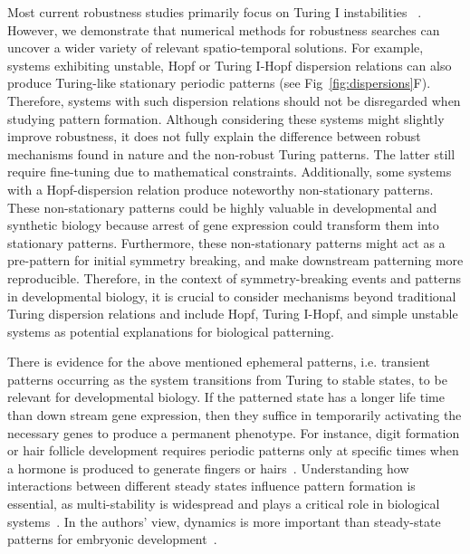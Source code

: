 \documentclass[10pt,letterpaper]{article}
\begin{document}
Most current robustness studies primarily focus on Turing I instabilities ~\parencite{Scholes2019, Zheng2016, Marcon}.
However, we demonstrate that numerical methods for robustness searches can uncover a wider variety of relevant spatio-temporal solutions.
For example, systems exhibiting unstable, Hopf or Turing I-Hopf dispersion relations can also produce Turing-like stationary periodic patterns (see Fig~\ref{fig:dispersions}F). Therefore, systems with such dispersion relations should not be disregarded when studying pattern formation.
Although considering these systems might slightly improve robustness, it does not fully explain the difference between robust mechanisms found in nature and the non-robust Turing patterns. The latter still require fine-tuning due to mathematical constraints.
Additionally, some systems with a Hopf-dispersion relation produce noteworthy non-stationary patterns.
These non-stationary patterns could be highly valuable in developmental and synthetic biology because arrest of gene expression could transform them into stationary patterns.
Furthermore, these non-stationary patterns might act as a pre-pattern for initial symmetry breaking, and make downstream patterning more reproducible. 
Therefore, in the context of symmetry-breaking events and patterns in developmental biology, it is crucial to consider mechanisms beyond traditional Turing dispersion relations and include Hopf, Turing I-Hopf, and simple unstable systems as potential explanations for biological patterning.


There is evidence for the above mentioned ephemeral patterns, i.e. transient patterns occurring as the system transitions from Turing to stable states, to be relevant for developmental biology. If the patterned state has a longer life time than down stream gene expression, then they suffice in temporarily activating the necessary genes to produce a permanent phenotype.
For instance, digit formation or hair follicle development requires periodic patterns only at specific times when a hormone is produced to generate fingers or hairs~\parencite{raspopovic2014digit,glover2023developmental}. 
Understanding how interactions between different steady states influence pattern formation is essential, as multi-stability is widespread and plays a critical role in biological systems~\parencite{laurent1999multistability}. In the authors' view, dynamics is more important than steady-state patterns for embryonic development~\parencite{pezzotta2023optimal}.
\end{document}
